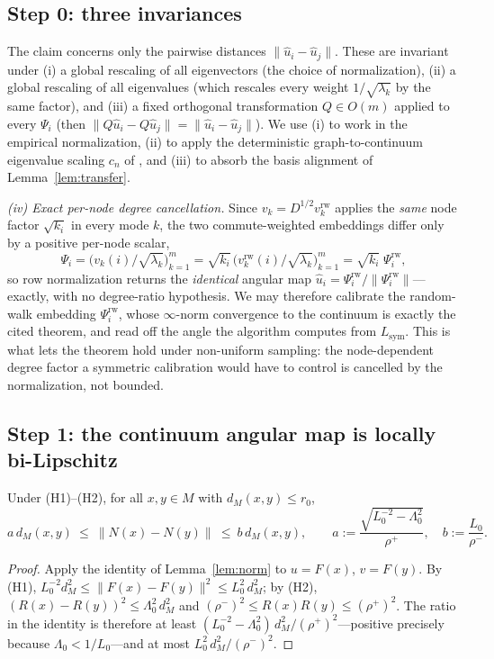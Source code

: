 \documentclass[review,supplement]{siamart220329}
\begin{document}
\subsection*{Step 0: three invariances}
The claim concerns only the pairwise distances $\lVert\hat u_i-\hat u_j\rVert$.
These are invariant under (i) a global rescaling of all eigenvectors (the choice
of normalization), (ii) a global rescaling of all eigenvalues (which rescales
every weight $1/\sqrt{\lambda_k}$ by the same factor), and (iii) a fixed
orthogonal transformation $Q\in O(m)$ applied to every $\Psi_i$ (then
$\lVert Q\hat u_i-Q\hat u_j\rVert=\lVert\hat u_i-\hat u_j\rVert$). We use (i) to
work in the empirical normalization, (ii) to apply the deterministic
graph-to-continuum eigenvalue scaling $c_n$ of \cite{calder2022}, and (iii) to
absorb the basis alignment of Lemma~\ref{lem:transfer}.

\smallskip\noindent\emph{(iv) Exact per-node degree cancellation.} Since
$v_k=D^{1/2}v^{\mathrm{rw}}_k$ applies the \emph{same} node factor $\sqrt{k_i}$ in
every mode $k$, the two commute-weighted embeddings differ only by a positive
per-node scalar,
\[
\Psi_i=\big(v_k(i)/\sqrt{\lambda_k}\big)_{k=1}^m
=\sqrt{k_i}\,\big(v^{\mathrm{rw}}_k(i)/\sqrt{\lambda_k}\big)_{k=1}^m
=\sqrt{k_i}\;\Psi^{\mathrm{rw}}_i ,
\]
so row normalization returns the \emph{identical} angular map
$\hat u_i=\Psi^{\mathrm{rw}}_i/\lVert\Psi^{\mathrm{rw}}_i\rVert$---exactly, with no
degree-ratio hypothesis. We may therefore calibrate the random-walk embedding
$\Psi^{\mathrm{rw}}_i$, whose $\infty$-norm convergence to the continuum is
exactly the cited theorem, and read off the angle the algorithm computes from
$L_{\mathrm{sym}}$. This is what lets the theorem hold under non-uniform sampling:
the node-dependent degree factor a symmetric calibration would have to control is
cancelled by the normalization, not bounded.

\subsection*{Step 1: the continuum angular map is locally bi-Lipschitz}
\begin{lemma}\label{lem:contang}
Under \textup{(H1)--(H2)}, for all $x,y\in M$ with $d_M(x,y)\le r_0$,
\[
a\,d_M(x,y)\ \le\ \lVert N(x)-N(y)\rVert\ \le\ b\,d_M(x,y),\qquad
a:=\frac{\sqrt{L_0^{-2}-\Lambda_0^2}}{\rho^+},\quad b:=\frac{L_0}{\rho^-}.
\]
\end{lemma}
\begin{proof}
Apply the identity of Lemma~\ref{lem:norm} to $u=F(x)$, $v=F(y)$. By (H1),
$L_0^{-2}d_M^2\le\lVert F(x)-F(y)\rVert^2\le L_0^2\,d_M^2$; by (H2),
$(R(x)-R(y))^2\le\Lambda_0^2\,d_M^2$ and $(\rho^-)^2\le R(x)R(y)\le(\rho^+)^2$.
The ratio in the identity is therefore at least
$(L_0^{-2}-\Lambda_0^2)\,d_M^2/(\rho^+)^2$---positive precisely because
$\Lambda_0<1/L_0$---and at most $L_0^2\,d_M^2/(\rho^-)^2$.
\end{proof}
\end{document}
